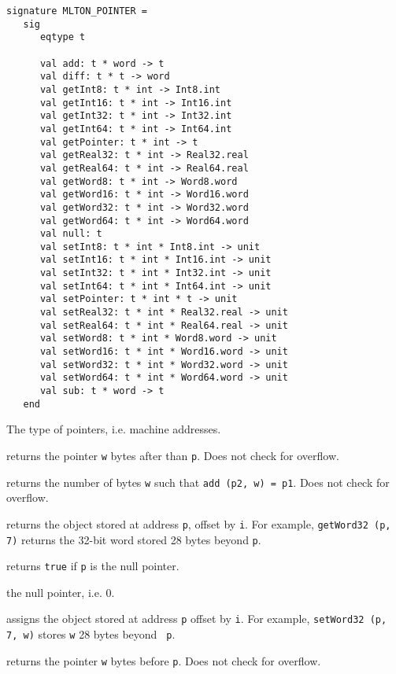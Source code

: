 \begin{verbatim}
signature MLTON_POINTER =
   sig
      eqtype t

      val add: t * word -> t
      val diff: t * t -> word
      val getInt8: t * int -> Int8.int
      val getInt16: t * int -> Int16.int
      val getInt32: t * int -> Int32.int
      val getInt64: t * int -> Int64.int
      val getPointer: t * int -> t
      val getReal32: t * int -> Real32.real
      val getReal64: t * int -> Real64.real
      val getWord8: t * int -> Word8.word
      val getWord16: t * int -> Word16.word
      val getWord32: t * int -> Word32.word
      val getWord64: t * int -> Word64.word
      val null: t
      val setInt8: t * int * Int8.int -> unit
      val setInt16: t * int * Int16.int -> unit
      val setInt32: t * int * Int32.int -> unit
      val setInt64: t * int * Int64.int -> unit
      val setPointer: t * int * t -> unit
      val setReal32: t * int * Real32.real -> unit
      val setReal64: t * int * Real64.real -> unit
      val setWord8: t * int * Word8.word -> unit
      val setWord16: t * int * Word16.word -> unit
      val setWord32: t * int * Word32.word -> unit
      val setWord64: t * int * Word64.word -> unit
      val sub: t * word -> t
   end
\end{verbatim}

\begin{description}
The type of pointers, i.e. machine addresses.

returns the pointer {\tt w} bytes after than {\tt p}.  Does not check
for overflow.

returns the number of bytes {\tt w} such that {\tt add (p2, w) = p1}.
Does not check for overflow.

returns the object stored at address {\tt p}, offset by {\tt i}.  For
example, {\tt getWord32 (p, 7)} returns the 32-bit word stored 28
bytes beyond {\tt p}.

returns {\tt true} if {\tt p} is the null pointer.

the null pointer, i.e. 0.

assigns the object stored at address {\tt p} offset by {\tt i}.  For
example, {\tt setWord32 (p, 7, w)} stores {\tt w} 28 bytes beyond {\tt
p}.

returns the pointer {\tt w} bytes before {\tt p}.  Does not check for
overflow.

\end{description}
%
